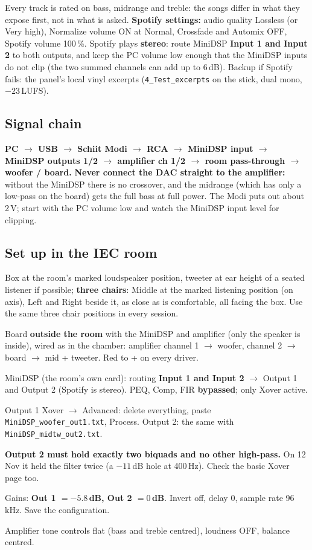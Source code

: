 \documentclass[11pt,a4paper]{article}
\newcommand{\warn}[1]{\textcolor{red!70!black}{\textbf{#1}}}
\begin{document}
Every track is rated on bass, midrange and treble: the songs differ in what they expose first, not in what is asked.
\textbf{Spotify settings:} audio quality Lossless (or Very high), Normalize volume ON at Normal, Crossfade and Automix OFF,
Spotify volume 100\,\%. Spotify plays \textbf{stereo}: route MiniDSP \textbf{Input 1 and Input 2} to both outputs, and keep the PC
volume low enough that the MiniDSP inputs do not clip (the two summed channels can add up to 6\,dB). Backup if Spotify fails: the
panel's local vinyl excerpts (\texttt{4\_Test\_excerpts} on the stick, dual mono, $-23$\,LUFS).

\subsection*{Signal chain}
\textbf{PC $\rightarrow$ USB $\rightarrow$ Schiit Modi $\rightarrow$ RCA $\rightarrow$ MiniDSP input $\rightarrow$ MiniDSP outputs 1/2 $\rightarrow$ amplifier
ch 1/2 $\rightarrow$ room pass-through $\rightarrow$ woofer / board.} \warn{Never connect the DAC straight to the amplifier:} without the
MiniDSP there is no crossover, and the midrange (which has only a low-pass on the board) gets the full bass at full power.
The Modi puts out about 2\,V; start with the PC volume low and watch the MiniDSP input level for clipping.

\subsection*{Set up in the IEC room}
\begin{chk}
\item Box at the room's marked loudspeaker position, tweeter at ear height of a seated listener if possible; \textbf{three chairs}: Middle at the marked listening position (on axis), Left and Right beside it, as close as is comfortable, all facing the box. Use the same three chair positions in every session.
\item Board \textbf{outside the room} with the MiniDSP and amplifier (only the speaker is inside), wired as in the chamber: amplifier channel 1 $\rightarrow$ woofer, channel 2 $\rightarrow$ board $\rightarrow$ mid + tweeter. Red to + on every driver.
\item MiniDSP (the room's own card): routing \textbf{Input 1 and Input 2} $\rightarrow$ Output 1 and Output 2 (Spotify is stereo). PEQ, Comp, FIR \textbf{bypassed}; only Xover active.
\item Output 1 Xover $\rightarrow$ Advanced: delete everything, paste \texttt{MiniDSP\_woofer\_out1.txt}, Process. Output 2: the same with \texttt{MiniDSP\_midtw\_out2.txt}.
\item \warn{Output 2 must hold exactly two biquads and no other high-pass.} On 12 Nov it held the filter twice (a $-11$\,dB hole at 400\,Hz). Check the basic Xover page too.
\item Gains: \textbf{Out 1 $=-5.8$\,dB, Out 2 $=0$\,dB}. Invert off, delay 0, sample rate 96\,kHz. Save the configuration.
\item Amplifier tone controls flat (bass and treble centred), loudness OFF, balance centred.
\end{chk}
\end{document}
